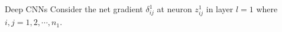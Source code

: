 \begin{frame}{Deep CNNs}
%
Consider the
net gradient $\delta^1_{ij}$ at neuron $z^1_{ij}$ in layer $l=1$ where
$i, j = 1, 2,
\cdots, n_1$. 
%

\end{frame}
